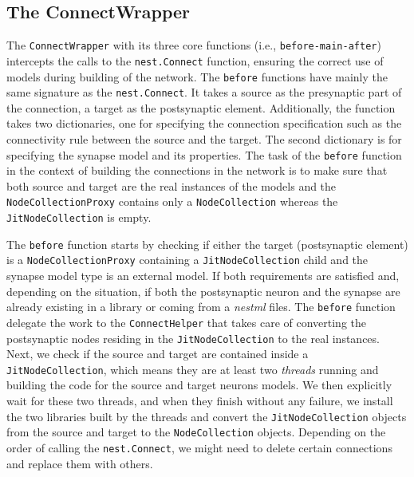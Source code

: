 \subsection{The ConnectWrapper}

The \texttt{ConnectWrapper} with its three core functions (i.e., \texttt{before-main-after}) intercepts the calls to the \texttt{nest.Connect} function, ensuring the correct use of models during building of the network. The \texttt{before} functions have mainly the same signature as the \texttt{nest.Connect}. It takes a source as the presynaptic part of the connection, a target as the postsynaptic element. Additionally, the function takes two dictionaries, one for specifying the connection specification such as the connectivity rule between the source and the target. The second dictionary is for specifying the synapse model and its properties. The task of the \texttt{before} function in the context of building the connections in the network is to make sure that both source and target are the real instances of the models and the \texttt{NodeCollectionProxy} contains only a \texttt{NodeCollection} whereas the \texttt{JitNodeCollection} is empty. 

The \texttt{before} function starts by checking if either the target (postsynaptic element) is a \texttt{NodeCollectionProxy} containing a \texttt{JitNodeCollection} child and the synapse model type is an external model. If both requirements are satisfied and, depending on the situation, if both the postsynaptic neuron and the synapse are already existing in a library or coming from a \emph{nestml} files. The \texttt{before} function delegate the work to the \texttt{ConnectHelper} that takes care of converting the postsynaptic nodes residing in the \texttt{JitNodeCollection} to the real instances. Next, we check if the source and target are contained inside a \texttt{JitNodeCollection}, which means they are at least two \emph{threads} running and building the code for the source and target neurons models. We then explicitly wait for these two threads, and when they finish without any failure, we install the two libraries built by the threads and convert the \texttt{JitNodeCollection} objects from the source and target to the \texttt{NodeCollection} objects. Depending on the order of calling the \texttt{nest.Connect}, we might need to delete certain connections and replace them with others. 

